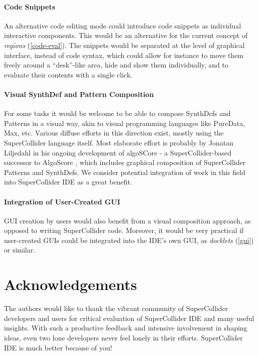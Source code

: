 \documentclass[11pt,a4paper]{article}
\begin{document}
\paragraph{Code Snippets} \hfill

An alternative code editing mode could introduce code snippets as individual interactive components. This would be
an alternative for the current concept of \emph{regions} (\ref{code-eval}). The snippets would be separated at the
level of graphical interface, instead of code syntax, which could allow for instance to move them freely around a
``desk''-like area, hide and show them individually, and to evaluate their contents with a single click.

\paragraph{Visual SynthDef and Pattern Composition} \hfill

For some tasks it would be welcome to be able to compose SynthDefs and Patterns in a visual way, akin to visual
programming languages like PureData, Max, etc. Various diffuse efforts in this direction exist, mostly using the
SuperCollider language itself. Most elaborate effort is probably by Jonatan Liljedahl in his ongoing development of
algoSCore - a SuperCollider-based successor to AlgoScore \cite{algoscore}, which includes graphical composition of
SuperCollider Patterns and SynthDefs. We consider potential integration of work in this field into SuperCollider IDE as
a great benefit.

\paragraph{Integration of User-Created GUI} \hfill

GUI creation by users would also benefit from a visual composition approach, as opposed to writing SuperCollider code.
Moreover, it would be very practical if user-created GUIs could be integrated into the IDE's own GUI, as
\emph{docklets} (\ref{gui}) or similar.


\section{Acknowledgements}

The authors would like to thank the vibrant community of SuperCollider developers and users for critical evaluation of
SuperCollider IDE and many useful insights. With such a productive feedback and intensive involvement in shaping ideas,
even two lone developers never feel lonely in their efforts. SuperCollider IDE is much better because of you!



\end{document}
